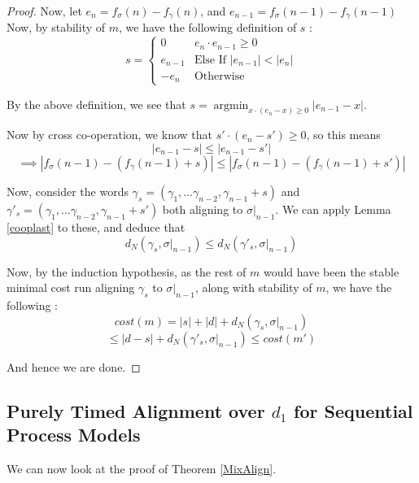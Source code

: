 \documentclass[runningheads]{llncs}
\newcounter{cases}
\DeclareMathOperator*{\argmin}{argmin}
\begin{document}
\begin{proof}
Now, let $e_n = f_\sigma(n) - f_\gamma(n)$, and $e_{n-1} = f_\sigma(n-1) - f_\gamma(n-1)$
Now, by stability of $m$, we have the following definition of $s$ : 
$$s = \begin{cases}
	0 & e_n\cdot e_{n-1} \geq 0 \\
	e_{n-1} & \textrm{Else If }|e_{n-1}| < |e_n| \\
	-e_n & \textrm{Otherwise}
\end{cases}$$

By the above definition, we see that $s = \argmin_{x \cdot (e_n - x) \geq 0} {|e_{n-1} - x|}$. 

Now by cross co-operation, we know that $s' \cdot (e_n - s') \geq 0$, so this means $$|e_{n-1} - s| \leq |e_{n-1} - s'| $$$$\implies |f_\sigma(n-1) - (f_\gamma(n-1) + s)| \leq |f_\sigma(n-1) - (f_\gamma(n-1) + s')|$$

Now, consider the words $\gamma_s = (\gamma_1, \dots \gamma_{n-2}, \gamma_{n-1} + s)$ and 
$\gamma'_s = (\gamma_1, \dots \gamma_{n-2}, \gamma_{n-1} + s')$ both aligning to $\sigma|_{n-1}$. We can apply Lemma \ref{cooplast} to these, and deduce that $$d_N(\gamma_s, \sigma|_{n-1}) \leq d_N(\gamma'_s, \sigma|_{n-1})$$

Now, by the induction hypothesis, as the rest of $m$ would have been the stable minimal cost run aligning $\gamma_s$ to $\sigma|_{n-1}$, along with stability of $m$, we have the following : 
$$cost(m) = |s| + |d| + d_N(\gamma_s, \sigma|_{n-1})$$$$ \leq |d-s| + d_N(\gamma'_s, \sigma|_{n-1}) \leq cost(m')$$

And hence we are done. 


\end{proof}


\subsection{Purely Timed Alignment over $d_1$ for Sequential Process Models} 
We can now look at the proof of Theorem \ref{MixAlign}. 
\end{document}
